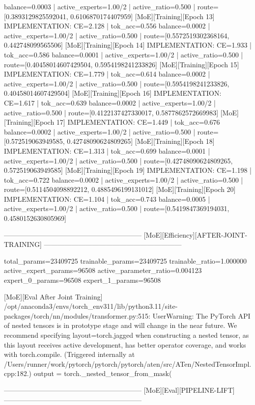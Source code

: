 balance=0.0003 | active_experts=1.00/2 | active_ratio=0.500 | route=[0.3893129825592041, 0.6106870174407959]
[MoE][Training][Epoch 13] IMPLEMENTATION: CE=2.128 | tok_acc=0.556
balance=0.0002 | active_experts=1.00/2 | active_ratio=0.500 | route=[0.5572519302368164, 0.442748099565506]
[MoE][Training][Epoch 14] IMPLEMENTATION: CE=1.933 | tok_acc=0.586
balance=0.0001 | active_experts=1.00/2 | active_ratio=0.500 | route=[0.40458014607429504, 0.5954198241233826]
[MoE][Training][Epoch 15] IMPLEMENTATION: CE=1.779 | tok_acc=0.614
balance=0.0002 | active_experts=1.00/2 | active_ratio=0.500 | route=[0.5954198241233826, 0.40458014607429504]
[MoE][Training][Epoch 16] IMPLEMENTATION: CE=1.617 | tok_acc=0.639
balance=0.0002 | active_experts=1.00/2 | active_ratio=0.500 | route=[0.4122137427330017, 0.5877862572669983]
[MoE][Training][Epoch 17] IMPLEMENTATION: CE=1.449 | tok_acc=0.676
balance=0.0002 | active_experts=1.00/2 | active_ratio=0.500 | route=[0.572519063949585, 0.42748090624809265]
[MoE][Training][Epoch 18] IMPLEMENTATION: CE=1.313 | tok_acc=0.699
balance=0.0001 | active_experts=1.00/2 | active_ratio=0.500 | route=[0.42748090624809265, 0.572519063949585]
[MoE][Training][Epoch 19] IMPLEMENTATION: CE=1.198 | tok_acc=0.722
balance=0.0002 | active_experts=1.00/2 | active_ratio=0.500 | route=[0.5114504098892212, 0.4885496199131012]
[MoE][Training][Epoch 20] IMPLEMENTATION: CE=1.104 | tok_acc=0.743
balance=0.0005 | active_experts=1.00/2 | active_ratio=0.500 | route=[0.5419847369194031, 0.4580152630805969]

------------------------------------------------------------
[MoE][Efficiency][AFTER-JOINT-TRAINING]
------------------------------------------------------------

total_params=23409725
trainable_params=23409725
trainable_ratio=1.000000
active_expert_params=96508
active_parameter_ratio=0.004123
expert_0_params=96508
expert_1_params=96508

[MoE][Eval After Joint Training]
/opt/anaconda3/envs/torch_env311/lib/python3.11/site-packages/torch/nn/modules/transformer.py:515: UserWarning: The PyTorch API of nested tensors is in prototype stage and will change in the near future. We recommend specifying layout=torch.jagged when constructing a nested tensor, as this layout receives active development, has better operator coverage, and works with torch.compile. (Triggered internally at /Users/runner/work/pytorch/pytorch/pytorch/aten/src/ATen/NestedTensorImpl.cpp:182.)
output = torch._nested_tensor_from_mask(

------------------------------------------------------------
[MoE][Eval][PIPELINE-LIFT]
------------------------------------------------------------

